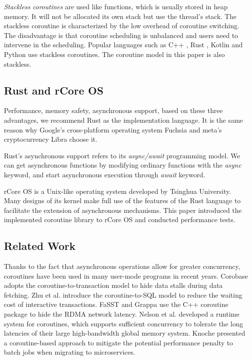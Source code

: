 \documentclass[conference]{IEEEtran}
\begin{document}
\emph{Stackless coroutines} are used like functions, which is usually stored in heap memory. It will not be allocated its own stack but use the thread's stack. The stackless coroutine is characterized by the low overhead of coroutine switching. The disadvantage is that coroutine scheduling is unbalanced and users need to intervene in the scheduling. Popular languages such as C++ \cite{8995550}, Rust \cite{weber2020process}, Kotlin \cite{elizarov2021kotlin} and Python \cite{tismer2000continuations} use stackless coroutines. The coroutine model in this paper is also stackless.

\subsection{Rust and rCore OS}

Performance, memory safety, asynchronous support, based on these three advantages, we recommend Rust as the implementation language. It is the same reason why Google's cross-platform operating system Fuchsia and meta's cryptocurrency Libra choose it.

Rust's asynchronous support refers to its \emph{async/await} programming model. We can get asynchronous functions by modifying ordinary functions with the \emph{async} keyword, and start asynchronous execution through \emph{await} keyword.

rCore OS \cite{rcore} is a Unix-like operating system developed by Tsinghua University. Many designs of its kernel make full use of the features of the Rust language to facilitate the extension of asynchronous mechanisms. This paper introduced the implemented coroutine library to rCore OS and conducted performance tests.

\subsection{Related Work}

Thanks to the fact that asynchronous operations allow for greater concurrency, coroutines have been used in many user-mode programs in recent years. Corobase \cite{he2020corobase} adopts the coroutine-to-transaction model to hide data stalls during data fetching. Zhu et al. \cite{zhu2018interactive} introduce the coroutine-to-SQL model to reduce the waiting cost of interactive transactions. FaSST \cite{kalia2016fasst} and Grappa \cite{nelson2015latency} use the C++ coroutine package to hide the RDMA network latency. Nelson et al. \cite{nelson2011crunching} developed a runtime system for coroutines, which supports sufficient concurrency to tolerate the long latencies of their large high-bandwidth global memory system. Knoche \cite{knoche2019improving} presented a coroutine-based approach to mitigate the potential performance penalty to batch jobs when migrating to microservices.
\end{document}
